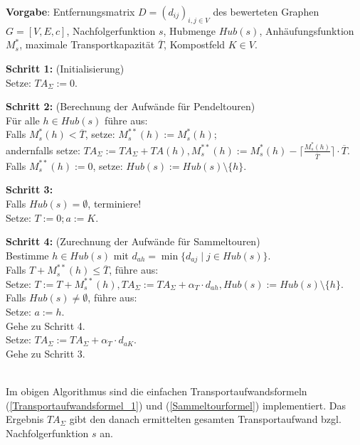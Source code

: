 \begin{algo}
\label{Algo_Berechnung_von_Transportaufwänden}
\textbf{Vorgabe}: Entfernungsmatrix $D=(d_{ij})_{i,j \in V}$ des bewerteten Graphen $G=[V,E,c]$, Nachfolgerfunktion $s$, Hubmenge $Hub(s)$, Anhäufungsfunktion $M^*_s$, maximale Transportkapazität $\overline{T}$, Kompostfeld $K \in V$.

\noindent 
\textbf{Schritt 1:} (Initialisierung)\\
\phantom \quad Setze: $TA_\Sigma := 0$.

\noindent 
\textbf{Schritt 2:} (Berechnung der Aufwände für Pendeltouren)\\
\phantom \quad Für alle $h \in Hub(s)$ führe aus:\\
\phantom \quad \qquad Falls $M^*_s(h) < \overline{T}$, setze: $M^{**}_s(h) := M^*_s(h)$;\\
\phantom \quad \qquad andernfalls setze: $TA_\Sigma := TA_\Sigma + TA(h), M^{**}_s(h) := M^*_s(h) - \bigl\lceil \frac{M^*_s(h)}{\overline{T}}\bigr\rceil \cdot \overline{T}$.\\
\phantom \quad Falls $M^{**}_s(h) := 0$, setze: $Hub(s) := Hub(s) \setminus \{h\}$.

\noindent 
\textbf{Schritt 3:}\\
\phantom \quad Falls $Hub(s) = \emptyset$, terminiere!\\
\phantom \quad Setze: $T:=0; a:=K$.

\noindent 
\textbf{Schritt 4:} (Zurechnung der Aufwände für Sammeltouren)\\
\phantom \quad Bestimme $h \in Hub(s)$ mit $d_{ah} = \min\{d_{aj} \mid j \in Hub(s)\}$.\\
\phantom \quad Falls $T + M^{**}_s(h) \leq \overline{T}$, führe aus:\\
\phantom \quad \qquad Setze: $T:=T+M^{**}_s(h), TA_\Sigma := TA_\Sigma+\alpha_T \cdot d_{ah}, Hub(s) := Hub(s) \setminus \{h\}$.\\
\phantom \quad \qquad Falls $Hub(s) \neq \emptyset$, führe aus:\\
\phantom \quad \qquad \qquad Setze: $a := h$.\\
\phantom \quad \qquad \qquad Gehe zu Schritt 4.\\
\phantom \quad Setze: $TA_\Sigma := TA_\Sigma + \alpha_T \cdot d_{aK}$.\\
\phantom \quad Gehe zu Schritt 3.
\end{algo}

\phantom \\
\noindent Im obigen Algorithmus sind die einfachen Transportaufwandsformeln (\ref{Transportaufwandsformel_1}) und (\ref{Sammeltourformel}) implementiert. Das Ergebnis $TA_\Sigma$ gibt den danach ermittelten gesamten Transportaufwand bzgl. Nachfolgerfunktion $s$ an. \\

